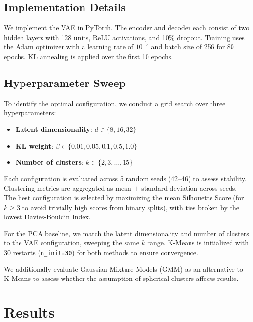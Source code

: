 \documentclass[11pt]{article}
\begin{document}
\subsection{Implementation Details}

We implement the VAE in PyTorch. The encoder and decoder each consist of two hidden layers with 128 units, ReLU activations, and 10\% dropout. Training uses the Adam optimizer with a learning rate of $10^{-3}$ and batch size of 256 for 80 epochs. KL annealing is applied over the first 10 epochs.

\subsection{Hyperparameter Sweep}

To identify the optimal configuration, we conduct a grid search over three hyperparameters:

\begin{itemize}
    \item \textbf{Latent dimensionality}: $d \in \{8, 16, 32\}$
    \item \textbf{KL weight}: $\beta \in \{0.01, 0.05, 0.1, 0.5, 1.0\}$
    \item \textbf{Number of clusters}: $k \in \{2, 3, \ldots, 15\}$
\end{itemize}

Each configuration is evaluated across 5 random seeds (42--46) to assess stability. Clustering metrics are aggregated as mean $\pm$ standard deviation across seeds. The best configuration is selected by maximizing the mean Silhouette Score (for $k \geq 3$ to avoid trivially high scores from binary splits), with ties broken by the lowest Davies-Bouldin Index.

For the PCA baseline, we match the latent dimensionality and number of clusters to the VAE configuration, sweeping the same $k$ range. K-Means is initialized with 30 restarts (\texttt{n\_init=30}) for both methods to ensure convergence.

We additionally evaluate Gaussian Mixture Models (GMM) as an alternative to K-Means to assess whether the assumption of spherical clusters affects results.

\section{Results}
\end{document}
